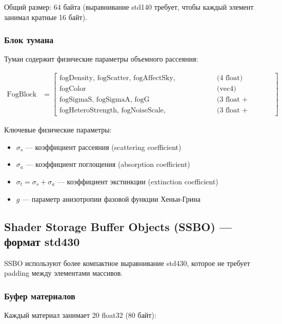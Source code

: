 \documentclass[14pt, a4paper]{extarticle}
\begin{document}
Общий размер: 64 байта (выравнивание std140 требует, чтобы каждый элемент занимал кратные 16 байт).

\subsubsection{Блок тумана}

Туман содержит физические параметры объемного рассеяния:

\begin{align}
\text{FogBlock} &= \begin{bmatrix}
\text{fogDensity, fogScatter, fogAffectSky, fogGpuVolumetric} & \text{(4 float)} \\
\text{fogColor} & \text{(vec4)} \\
\text{fogSigmaS, fogSigmaA, fogG} & \text{(3 float + padding)} \\
\text{fogHeteroStrength, fogNoiseScale, fogNoiseOctaves} & \text{(3 float + padding)}
\end{bmatrix}
\end{align}

Ключевые физические параметры:
\begin{itemize}
    \item $\sigma_s$ --- коэффициент рассеяния (scattering coefficient)
    \item $\sigma_a$ --- коэффициент поглощения (absorption coefficient)
    \item $\sigma_t = \sigma_s + \sigma_a$ --- коэффициент экстинкции (extinction coefficient)
    \item $g$ --- параметр анизотропии фазовой функции Хеньи-Грина
\end{itemize}

\subsection{Shader Storage Buffer Objects (SSBO) --- формат std430}

SSBO используют более компактное выравнивание std430, которое не требует padding между элементами массивов.

\subsubsection{Буфер материалов}

Каждый материал занимает 20 float32 (80 байт):
\end{document}

